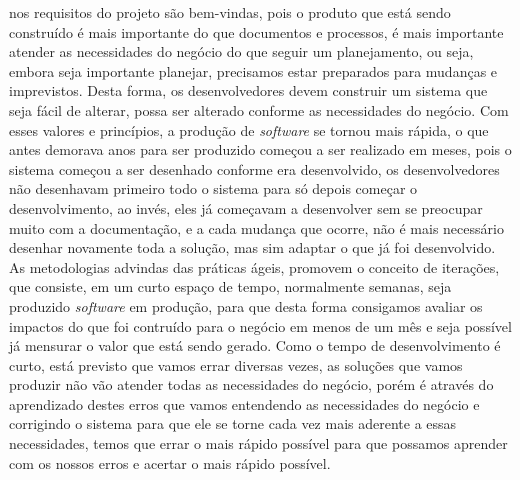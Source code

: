     nos requisitos do projeto são bem-vindas, pois o produto que está sendo
    construído é mais importante do que documentos e processos, é mais
    importante atender as necessidades do negócio do que seguir um planejamento,
    ou seja, embora seja importante planejar, precisamos estar preparados para
    mudanças e imprevistos. Desta forma, os desenvolvedores devem construir
    um sistema que seja fácil de alterar, possa ser alterado conforme as necessidades
    do negócio. \newline
    Com esses valores e princípios, a produção de \textit{software} se tornou
    mais rápida, o que antes demorava anos para ser produzido começou a ser
    realizado em meses, pois o sistema começou a ser desenhado conforme era
    desenvolvido, os desenvolvedores não desenhavam primeiro todo o sistema
    para só depois começar o desenvolvimento, ao invés, eles já começavam a
    desenvolver sem se preocupar muito com a documentação, e a cada mudança
    que ocorre, não é mais necessário desenhar novamente toda a solução, mas
    sim adaptar o que já foi desenvolvido. \newline
    As metodologias advindas das práticas ágeis, promovem o conceito de iterações,
    que consiste, em um curto espaço de tempo, normalmente semanas, seja produzido
    \textit{software} em produção, para que desta forma consigamos avaliar os impactos
    do que foi contruído para o negócio em menos de um mês e seja possível já mensurar
    o valor que está sendo gerado. Como o tempo de desenvolvimento é curto, está
    previsto que vamos errar diversas vezes, as soluções que vamos produzir não
    vão atender todas as necessidades do negócio, porém é através do aprendizado
    destes erros que vamos entendendo as necessidades do negócio e corrigindo o
    sistema para que ele se torne cada vez mais aderente a essas necessidades,
    temos que errar o mais rápido possível para que possamos aprender com os nossos
    erros e acertar o mais rápido possível.

